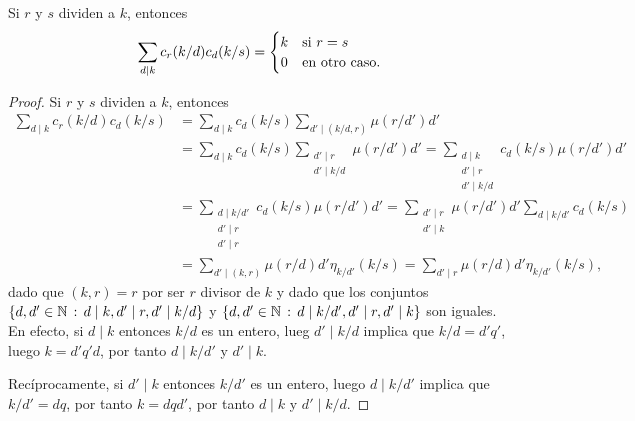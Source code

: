 \begin{lemma}\label{lem:ram4}
Si $r$ y $s$ dividen a $k$, entonces
\begin{equation*}
    \sum_{d \mid k} c_r(k/d) c_d(k/s) = \begin{cases}
        \hfil k & \text{si } r = s \\
        \hfil 0 & \text{en otro caso}.
    \end{cases}
\end{equation*}
\end{lemma}
\begin{proof}
Si $r$ y $s$ dividen a $k$, entonces
\begin{equation} \label{eq:ram2}
\begin{split}
\sum_{d \mid k} c_r (k/d) c_d (k/s) &= \sum_{d \mid k} c_d (k/s) \sum_{d' \mid (k/d,r)} \mu (r/d') d' \\
                                                                              &= \sum_{d \mid k} c_d (k/s) \sum_{\substack{d' \mid r \\ d' \mid k/d}} \mu(r/d') d' = \sum_{\substack{d \mid k \\ d' \mid r \\ d' \mid k/d}} c_d (k/s) \mu (r/d') d' \\
                                                                              &= \sum_{\substack{d \mid k/d' \\ d' \mid r \\ d' \mid r}} c_d(k/s) \mu(r/d')  d' = \sum_{\substack{d' \mid r \\ d' \mid k}} \mu(r/d') d' \sum_{d \mid k/d'} c_d(k/s) \\
                                                                              &= \sum_{d' \mid (k,r)} \mu(r/d) d' \eta_{k/d'} (k/s) = \sum_{d' \mid r} \mu(r/d) d' \eta_{k/d'} (k/s),
\end{split}
\end{equation}
dado que $(k,r)=r$ por ser $r$ divisor de $k$ y dado que los conjuntos $\{ d,d' \in \mathbb{N} \, : \, d \mid k, d' \mid r, d' \mid k/d \}$ y $\{ d,d' \in \mathbb{N} \, : \, d \mid k/d', d' \mid r, d' \mid k \}$ son iguales. En efecto, si $d \mid k$ entonces $k/d$ es un entero, lueg $d' \mid k/d$ implica que $k/d=d' q'$, luego $k=d' q' d$, por tanto $d \mid k/d'$ y $d' \mid k$.
\bigskip

Recíprocamente, si $d' \mid k$ entonces $k/d'$ es un entero, luego $d \mid k/d'$ implica que $k/d'=dq$, por tanto $k=d q d'$, por tanto $d \mid k$ y $d' \mid k/d$.
\bigskip


\end{proof}
